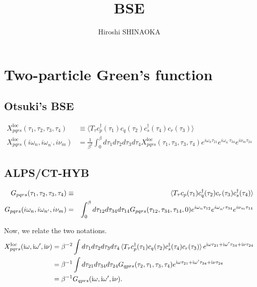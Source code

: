 \documentclass[disablejfam,12pt]{article}
\author{Hiroshi SHINAOKA}
\newcommand{\mathi}{\ensuremath{\mathrm{i}}}
\newcommand{\mi}{\ensuremath{\mathrm{i}}}
\begin{document}
\title{BSE}
\maketitle
\thispagestyle{empty}

\section{Two-particle Green's function}

\subsection{Otsuki's BSE}
\begin{align}
X^\mathrm{loc}_{pqrs}(\tau_1, \tau_2, \tau_3, \tau_4) &\equiv \langle T_\tau c^\dagger_p(\tau_1) c_q(\tau_2)  c^\dagger_s(\tau_4) c_r(\tau_3)\rangle\nonumber\\
X^\mathrm{loc}_{pqrs}(i \omega_n, i \omega_{n^\prime}, i\nu_m) &= \frac{1}{\beta^2}\int_0^\beta  d\tau_1 d\tau_2 d\tau_3 d\tau_4 X^\mathrm{loc}_{pqrs}(\tau_1, \tau_3, \tau_3, \tau_4) e^{i\omega_n \tau_{21}} e^{i\omega_{n^\prime} \tau_{34}}e^{i \nu_m \tau_{24}}
\end{align}

\subsection{ALPS/CT-HYB}
\begin{eqnarray}
 G_{pqrs}(\tau_1, \tau_2, \tau_3, \tau_4) &\equiv& \braket{T_\tau c_p(\tau_1) c_q^\dagger(\tau_2) c_r(\tau_3) c_s^\dagger(\tau_4)}\\
 G_{pqrs}(i \omega_n, i \omega_{n^\prime}, i\nu_m) &=& \int_0^\beta  d \tau_{12} d \tau_{34} d \tau_{14} G_{pqrs}(\tau_{12}, \tau_{34}, \tau_{14}, 0) e^{i\omega_n \tau_{12}} e^{i\omega_{n^\prime} \tau_{34}}e^{i \nu_m \tau_{14}}
\end{eqnarray}

Now, we relate the two notations.
\begin{align}
X^\mathrm{loc}_{pqrs}(\mi \omega, \mi \omega^\prime, \mi \nu) &= \beta^{-2} \int d\tau_1 d\tau_2 d\tau_3 d\tau_4 \braket{T_\tau c^\dagger_p(\tau_1) c_q(\tau_2) c^\dagger_s(\tau_4) c_r(\tau_3)} e^{\mathi \omega \tau_{21} + \mathi \omega^\prime \tau_{34} + \mathi \nu \tau_{24}}\nonumber\\
&= \beta^{-1} \int d\tau_{21} d\tau_{34} d \tau_{24} G_{qprs}(\tau_2, \tau_1, \tau_3, \tau_4) e^{\mathi \omega \tau_{21} + \mathi \omega^\prime \tau_{34} + \mathi \nu \tau_{24}}\nonumber\\
&= \beta^{-1} G_{qprs}(\mi\omega, \mi\omega^\prime, \mi\nu).
\end{align}
\end{document}

